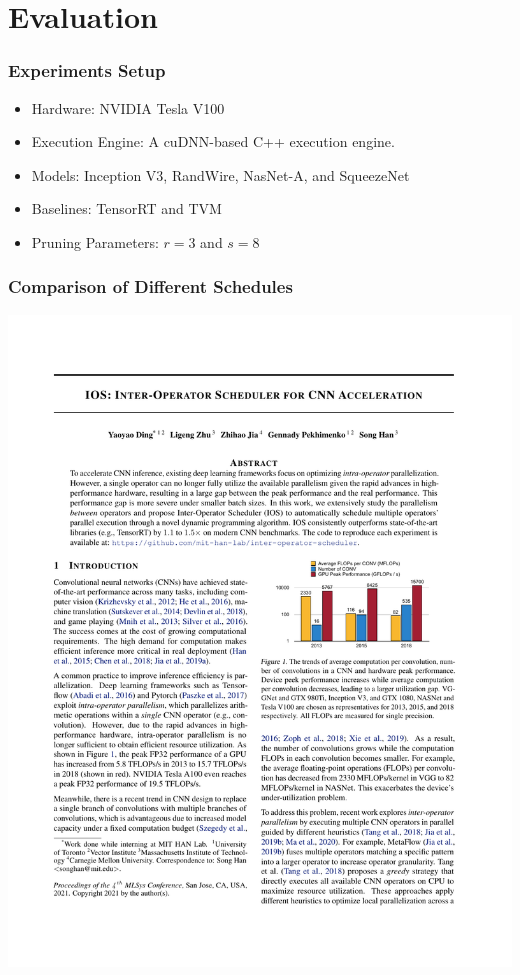 \documentclass[12pt,aspectratio=169]{beamer}
\begin{document}
    \section{Evaluation}

    \begin{frame}
        \frametitle{Experiments Setup}

        \begin{itemize}
            \setlength{\itemsep}{.8em}
            \item Hardware: NVIDIA Tesla V100
            \item Execution Engine: A cuDNN-based C++ execution engine.
            \item Models: Inception V3, RandWire, NasNet-A, and SqueezeNet
            \item Baselines: TensorRT and TVM
            \item Pruning Parameters: $r = 3$ and $s = 8$
        \end{itemize}
    \end{frame}

    \begin{frame}
        \frametitle{Comparison of Different Schedules}

        \begin{center}
            \includegraphics[page=8,trim=1.8cm 22.2cm 11cm 2.2cm,clip,scale=1.2]{paper.pdf}
        \end{center}
    \end{frame}
\end{document}

